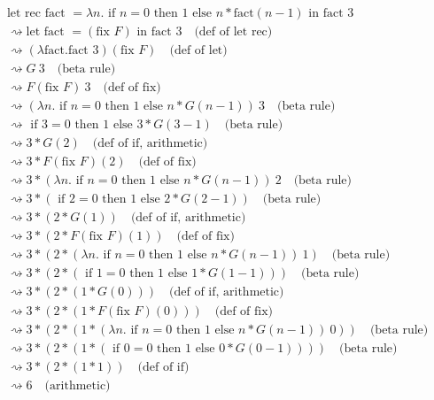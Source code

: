 \documentclass[12pt]{article}
\begin{document}
\begin{align}
&\text{let rec fact } = \lambda n.\text{ if } n=0 \text{ then } 1 \text{ else } n * \text{fact}(n-1) \text{ in fact } 3 \\
&\rightsquigarrow \text{let fact } = (\text{fix } F) \text{ in fact } 3 \quad \text{(def of let rec)} \\
&\rightsquigarrow (\lambda \text{fact}. \text{fact } 3) (\text{fix } F) \quad \text{(def of let)} \\
&\rightsquigarrow G \ 3 \quad \text{(beta rule)} \\
&\rightsquigarrow F(\text{fix } F) \ 3 \quad \text{(def of fix)} \\
&\rightsquigarrow (\lambda n.\text{ if } n=0 \text{ then } 1 \text{ else } n * G(n-1)) \ 3 \quad \text{(beta rule)} \\
&\rightsquigarrow \text{ if } 3=0 \text{ then } 1 \text{ else } 3 * G(3-1) \quad \text{(beta rule)} \\
&\rightsquigarrow 3 * G(2) \quad \text{(def of if, arithmetic)} \\
&\rightsquigarrow 3 * F(\text{fix } F)(2) \quad \text{(def of fix)} \\
&\rightsquigarrow 3 * (\lambda n.\text{ if } n=0 \text{ then } 1 \text{ else } n * G(n-1)) \ 2 \quad \text{(beta rule)} \\
&\rightsquigarrow 3 * (\text{ if } 2=0 \text{ then } 1 \text{ else } 2 * G(2-1)) \quad \text{(beta rule)} \\
&\rightsquigarrow 3 * (2 * G(1)) \quad \text{(def of if, arithmetic)} \\
&\rightsquigarrow 3 * (2 * F(\text{fix } F)(1)) \quad \text{(def of fix)} \\
&\rightsquigarrow 3 * (2 * (\lambda n.\text{ if } n=0 \text{ then } 1 \text{ else } n * G(n-1)) \ 1) \quad \text{(beta rule)} \\
&\rightsquigarrow 3 * (2 * (\text{ if } 1=0 \text{ then } 1 \text{ else } 1 * G(1-1))) \quad \text{(beta rule)} \\
&\rightsquigarrow 3 * (2 * (1 * G(0))) \quad \text{(def of if, arithmetic)} \\
&\rightsquigarrow 3 * (2 * (1 * F(\text{fix } F)(0))) \quad \text{(def of fix)} \\
&\rightsquigarrow 3 * (2 * (1 * (\lambda n.\text{ if } n=0 \text{ then } 1 \text{ else } n * G(n-1)) \ 0)) \quad \text{(beta rule)} \\
&\rightsquigarrow 3 * (2 * (1 * (\text{ if } 0=0 \text{ then } 1 \text{ else } 0 * G(0-1)))) \quad \text{(beta rule)} \\
&\rightsquigarrow 3 * (2 * (1 * 1)) \quad \text{(def of if)} \\
&\rightsquigarrow 6 \quad \text{(arithmetic)}
\end{align}
\end{document}
